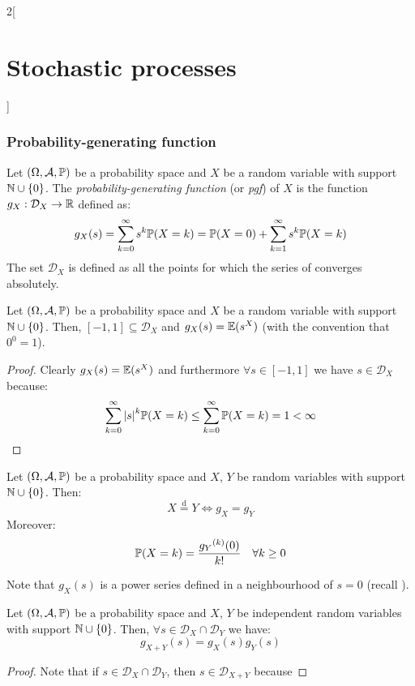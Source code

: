 \documentclass[../../../main_math.tex]{subfiles}
\begin{document}
\begin{multicols}{2}[\section{Stochastic processes}]
  \subsubsection{Probability-generating function}
  \begin{definition}
    Let $(\Omega,\mathcal{A},\mathbb{P})$ be a probability space and $X$ be a random variable with support $\mathbb{N}\cup\{0\}$. The \emph{probability-generating function} (or \emph{pgf}) of $X$ is the function $g_X:\mathcal{D}_X\rightarrow \mathbb{R}$ defined as:
    \begin{equation}\label{SP:probgenfunc}
      g_X(s)=\sum_{k=0}^\infty s^k\mathbb{P}(X=k)=\mathbb{P}(X=0)+\sum_{k=1}^\infty s^k\mathbb{P}(X=k)
    \end{equation}
    The set $\mathcal{D}_X$ is defined as all the points for which the series of  converges absolutely.
  \end{definition}
  \begin{lemma}
    Let $(\Omega,\mathcal{A},\mathbb{P})$ be a probability space and $X$ be a random variable with support $\mathbb{N}\cup\{0\}$. Then, $[-1,1]\subseteq \mathcal{D}_X$ and $g_X(s)=\mathbb{E}(s^X)$ (with the convention that $0^0=1$).
  \end{lemma}
  \begin{proof}
    Clearly $g_X(s)=\mathbb{E}(s^X)$ and furthermore $\forall s\in[-1,1]$ we have $s\in \mathcal{D}_X$ because:
    $$\sum_{k=0}^\infty \abs{s}^k\mathbb{P}(X=k)\leq \sum_{k=0}^\infty \mathbb{P}(X=k)=1<\infty$$
  \end{proof}
  \begin{theorem}
    Let $(\Omega,\mathcal{A},\mathbb{P})$ be a probability space and $X$, $Y$ be random variables with support $\mathbb{N}\cup\{0\}$. Then: $$X\overset{\text{d}}{=}Y\iff g_X=g_Y$$
    Moreover: $$\mathbb{P}(X=k)=\frac{{g_Y}^{(k)}(0)}{k!}\quad \forall k\geq 0$$
  \end{theorem}
  \begin{sproof}
    Note that $g_X(s)$ is a power series defined in a neighbourhood of $s=0$ (recall ).
  \end{sproof}
  \begin{theorem}
    Let $(\Omega,\mathcal{A},\mathbb{P})$ be a probability space and $X$, $Y$ be independent random variables with support $\mathbb{N}\cup\{0\}$. Then, $\forall s\in\mathcal{D}_X\cap \mathcal{D}_Y$ we have: $$g_{X+Y}(s)=g_X(s)g_Y(s)$$
  \end{theorem}
  \begin{proof}
    Note that if $s\in\mathcal{D}_X\cap \mathcal{D}_Y$, then $s\in\mathcal{D}_{X+Y}$ because

\end{proof}
\end{multicols}
\end{document}

